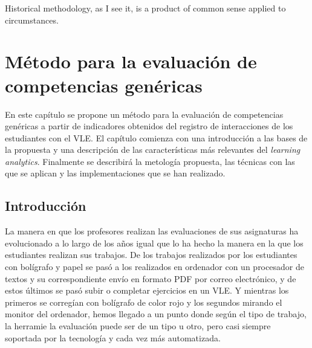 

\begin{savequote}[50mm]
Historical methodology, as I see it, is a product of common sense applied to circumstances. 
\end{savequote}


\chapter{Método para la evaluación de competencias genéricas}
\label{cha:Overall methodology}

\ifpdf
    \graphicspath{{4_overall_methodology/figures/PNG/}{4_overall_methodology/figures/PDF/}{4_overall_methodology/figures/}}
\else
    \graphicspath{{4_overall_methodology/figures/EPS/}{4_overall_methodology/figures/}}
\fi



En este capítulo se propone un método para la evaluación de competencias genéricas a partir de indicadores obtenidos del registro de interacciones de los estudiantes con el VLE. El capítulo comienza con una introducción a las bases de la propuesta y una descripción de las características más relevantes del \emph{learning analytics}. Finalmente se describirá la metología propuesta, las técnicas con las que se aplican y las implementaciones que se han realizado.

\section{Introducción}

La manera en que los profesores realizan las evaluaciones de sus asignaturas ha evolucionado a lo largo de los años igual que lo ha hecho la manera en la que los estudiantes realizan sus trabajos. De los trabajos realizados por los estudiantes con bolígrafo y papel se pasó a los realizados en ordenador con un procesador de textos y su correspondiente envío en formato PDF por correo electrónico, y de estos últimos se pasó subir o completar ejercicios en un VLE. Y mientras los primeros se corregían con bolígrafo de color rojo y los segundos mirando el monitor del ordenador, hemos llegado a un punto donde según el tipo de trabajo, la herramie la evaluación puede ser de un tipo u otro, pero casi siempre soportada por la tecnología y cada vez más automatizada.

